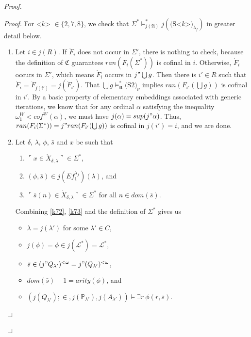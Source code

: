 \documentclass[12pt]{article}
\numberwithin{equation}{section}
\begin{document}
\begin{proof}
\begin{proof}
For <$k$> $\in \{2, 7, 8\}$, we check that $\Sigma^* \models^*_{j(\mathfrak{A})} j(\text{(S<} k \text{>)}_{\lambda_f})$ in greater detail below. 

\begin{enumerate}[label=<$k$> $\eq$ \arabic* :, leftmargin=70pt]
    \addtocounter{enumi}{1}
    \item Let $i \in j(R)$. If $\dot{F}_i$ does not occur in $\Sigma'$, there is nothing to check, because the definition of $\mathfrak{C}$ guarantees $ran(F_i(\Sigma^*))$ is cofinal in $i$. Otherwise, $\dot{F}_i$ occurs in $\Sigma'$, which means $\dot{F}_i$ occurs in $j" \bigcup g$. Then there is $i' \in R$ such that $\dot{F}_i = \dot{F}_{j(i')} = j(\dot{F}_{i'})$. That $\bigcup g \models^*_{\mathfrak{A}} \text{(S2)}_{\nu}$ implies $ran(F_{i'}(\bigcup g))$ is cofinal in $i'$. By a basic property of elementary embeddings associated with generic iterations, we know that for any ordinal $\alpha$ satisfying the inequality $\omega_1^W < cof^{W}(\alpha)$, we must have $j(\alpha) = sup(j" \alpha)$. Thus, $ran(F_i(\Sigma^*)) = j" ran(F_{i'}(\bigcup g))$ is cofinal in $j(i') = i$, and we are done.
    \addtocounter{enumi}{4}
    \item\label{k7m} Let $\delta$, $\lambda$, $\phi$, $\bar{s}$ and $x$ be such that 
    \begin{enumerate}[label=(K7.\arabic*), leftmargin=50pt]
        \item $\ulcorner x \in \dot{X}_{\delta, \lambda} \urcorner \in \Sigma^*$,
        \item\label{k72} $(\phi, \bar{s}) \in j(Ef_1^{\lambda_f})(\lambda)$, and
        \item\label{k73} $\ulcorner \bar{s}(n) \in \dot{X}_{\delta, \lambda} \urcorner \in \Sigma^*$ for all $n \in dom(\bar{s})$.
    \end{enumerate}
    Combining \ref{k72}, \ref{k73} and the definition of $\Sigma^*$ gives us 
    \begin{itemize}
        \item $\lambda = j(\lambda')$ for some $\lambda' \in C$,
        \item $j(\phi) = \phi \in j(\mathcal{L}^*) = \mathcal{L}^*$,
        \item $\bar{s} \in (j" Q_{\lambda'})^{< \omega} = j" (Q_{\lambda'})^{< \omega}$,
        \item $dom(\bar{s}) + 1 = arity(\phi)$, and
        \item $(j(Q_{\lambda'}); \in, j(\mathbb{P}_{\lambda'}), j(A_{\lambda'})) \models \exists r \ \phi(r, \bar{s})$.

\end{itemize}
\end{enumerate}
\end{proof}
\end{proof}
\end{document}
